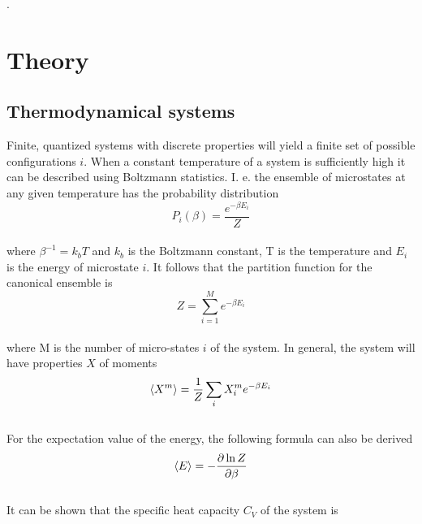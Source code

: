 \documentclass[%
reprint,nofootinbib,
amsmath,amssymb,
aps,
]{revtex4-1}
\begin{document}
 \newpage. \newpage 
\onecolumngrid
\section{Theory} \noindent 
\vspace{3mm}
\twocolumngrid
\subsection*{Thermodynamical systems} \noindent 
Finite, quantized systems with discrete properties will yield a finite set of possible configurations $i$. When a constant temperature of a system is sufficiently high it can be described using  Boltzmann statistics. I. e. the ensemble of microstates at any given temperature has the probability distribution \vspace{1mm}
\begin{equation}\label{tr}
P_i(\beta) = \dfrac{e^{-\beta E_i}}{Z}
\end{equation}  \vspace{1mm} \\ 
where $\beta^{-1} = k_bT$ and $k_b$ is the Boltzmann constant, T is the temperature and $E_i$ is the energy of microstate $i$. It follows that the partition function for the canonical ensemble is \vspace{1mm}
\begin{equation}\label{pf}
Z = \sum_{i = 1}^{M}e^{-\beta E_i}
\end{equation}\vspace{1mm} \\ 
where M is the number of micro-states $i$ of the system. In general, the system will have properties $X$ of moments \vspace{1mm}
\begin{equation*}
\expval{X^m} = \dfrac{1}{Z}\sum_iX_i^me^{-\beta E_i}
\end{equation*}\vspace{1mm} \\ 
For the expectation value of the energy, the following formula can also be derived \vspace{1mm} \\ 
\begin{equation}\label{ev}
\expval{E} = -\dfrac{\partial\ln Z}{\partial\beta}
\end{equation}\vspace{1mm} \\ 
It can be shown that the specific heat capacity $C_V$ of the system is \vspace{1mm} \\ 
\end{document}
